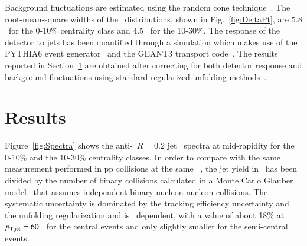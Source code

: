 \documentclass[3p,times]{simplearticle}
\begin{document}
%
Background fluctuations are estimated using the random cone technique~\cite{ALICE:2012a}.  
The root-mean-square widths of the \dpT\ distributions, shown in Fig.~\ref{fig:DeltaPt},
are $5.8$ \GeVc\ for the 0-10\% centrality class and $4.5$ \GeVc\ for the 10-30\%. 
The response of the detector to jets has been quantified through a simulation which makes use of the PYTHIA6 event generator~\cite{Sjostrand:2006} 
and the GEANT3 transport code~\cite{Brun:1994}. 
The results reported in Section~\ref{sec:results} are obtained after correcting for both detector response and background fluctuations using 
standard regularized unfolding methods~\cite{Hocker:1995, Dagostini:1995}.
%
\section{Results}
\label{sec:results}
%
Figure~\ref{fig:Spectra} shows the anti-\kt\ $R=0.2$ jet \pT\ spectra at mid-rapidity for the 0-10\% and the 10-30\% centrality classes. 
In order to compare with the same measurement performed in pp
collisions at the same \snn~\cite{ALICE:2013c}, the jet yield in \PbPb\ has been divided by the number of binary collisions
calculated in a Monte Carlo Glauber model~\cite{ALICE:2013b} that assumes independent binary nucleon-nucleon collisions.
The systematic uncertainty is dominated by the tracking efficiency uncertainty and the unfolding regularization and is \pT\ dependent, 
with a value of
about 18\% at $p_{\rm T,jet}=60$ \GeVc\ for the central events and only slightly smaller for the semi-central events. 
\end{document}
